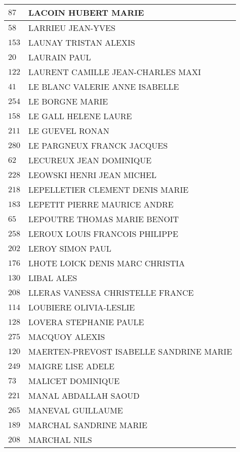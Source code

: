 \begin{xltabular}{\linewidth}{|l|X|}
    $87$ & LACOIN HUBERT MARIE \\
    \hline
    $58$ & LARRIEU JEAN-YVES \\
    \hline
    $153$ & LAUNAY TRISTAN ALEXIS \\
    \hline
    $20$ & LAURAIN PAUL \\
    \hline
    $122$ & LAURENT CAMILLE JEAN-CHARLES MAXI \\
    \hline
    $41$ & LE BLANC VALERIE ANNE ISABELLE \\
    \hline
    $254$ & LE BORGNE MARIE \\
    \hline
    $158$ & LE GALL HELENE LAURE \\
    \hline
    $211$ & LE GUEVEL RONAN \\
    \hline
    $280$ & LE PARGNEUX FRANCK JACQUES \\
    \hline
    $62$ & LECUREUX JEAN DOMINIQUE \\
    \hline
    $228$ & LEOWSKI HENRI JEAN MICHEL \\
    \hline
    $218$ & LEPELLETIER CLEMENT DENIS MARIE \\
    \hline
    $183$ & LEPETIT PIERRE MAURICE ANDRE \\
    \hline
    $65$ & LEPOUTRE THOMAS MARIE BENOIT \\
    \hline
    $258$ & LEROUX LOUIS FRANCOIS PHILIPPE \\
    \hline
    $202$ & LEROY SIMON PAUL \\
    \hline
    $176$ & LHOTE LOICK DENIS MARC CHRISTIA \\
    \hline
    $130$ & LIBAL ALES \\
    \hline
    $208$ & LLERAS VANESSA CHRISTELLE FRANCE \\
    \hline
    $114$ & LOUBIERE OLIVIA-LESLIE \\
    \hline
    $128$ & LOVERA STEPHANIE PAULE \\
    \hline
    $275$ & MACQUOY ALEXIS \\
    \hline
    $120$ & MAERTEN-PREVOST ISABELLE SANDRINE MARIE \\
    \hline
    $249$ & MAIGRE LISE ADELE \\
    \hline
    $73$ & MALICET DOMINIQUE \\
    \hline
    $221$ & MANAL ABDALLAH SAOUD \\
    \hline
    $265$ & MANEVAL GUILLAUME \\
    \hline
    $189$ & MARCHAL SANDRINE MARIE \\
    \hline
    $208$ & MARCHAL NILS \\

\end{xltabular}
